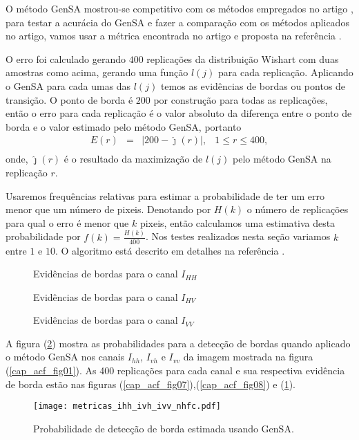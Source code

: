 	O método GenSA mostrou-se competitivo com os métodos empregados no artigo \citet{nhfc}, para testar a acurácia do GenSA e fazer a comparação com os métodos aplicados no artigo, vamos usar a métrica encontrada no artigo \citep{nhfc} e proposta na referência \citep{fbgm}.
        
	O erro foi calculado gerando $400$ replicações da distribuição Wishart com duas amostras como acima, gerando uma função $l(j)$ para cada replicação. Aplicando o GenSA para cada umas das $l(j)$ temos as evidências de bordas ou pontos de transição. O ponto de borda é $200$ por construção para todas as replicações, então o erro para cada replicação é o valor absoluto da diferença entre o ponto de borda e o valor estimado pelo método GenSA, portanto  
\begin{equation}\label{cap_acf_26}
\begin{array}{llll}
	E(r) &=& |200 - \hat{\jmath}(r)|, & 1\leq r \leq 400,  \\
\end{array}
\end{equation}
onde, $\hat{\jmath}(r)$ é o resultado da maximização de $l(j)$ pelo método GenSA na replicação $r$.

Usaremos frequências relativas para estimar a probabilidade de ter um erro menor que um número de pixeis. Denotando por $H(k)$ o número de replicações para qual o erro é menor que $k$ pixeis, então calculamos uma estimativa desta probabilidade por $f(k)=\frac{H(k)}{400}$. Nos testes realizados nesta seção variamos $k$ entre $1$ e $10$. O algoritmo está descrito em detalhes na referência \citep{fbgm}. 
\begin{figure}[hbt]
\caption{Evidências de bordas para o canal $I_{HH}$}\label{cap_acf_fig07}
\endminipage\hfill
{}
\caption{Evidências de bordas para o canal $I_{HV}$}\label{cap_acf_fig08}
\endminipage\hfill
\centering
{}
\caption{Evidências de bordas para o canal $I_{VV}$}\label{cap_acf_fig09}
\endminipage\hfill
\end{figure}

	A figura (\ref{cap_acf_fig10}) mostra as probabilidades para a detecção de bordas quando aplicado o método GenSA nos canais $I_{hh}$, $I_{vh}$ e $I_{vv}$ da imagem mostrada na figura (\ref{cap_acf_fig01}). As 400 replicações para cada canal e sua respectiva evidência de borda estão nas figuras (\ref{cap_acf_fig07}),(\ref{cap_acf_fig08}) e (\ref{cap_acf_fig09}).  
\begin{figure}[hbt]
\centering
	\texttt{[image: metricas\_ihh\_ivh\_ivv\_nhfc.pdf]}
	\caption{Probabilidade de detecção de borda estimada usando GenSA.}
\label{cap_acf_fig10}
\end{figure}

